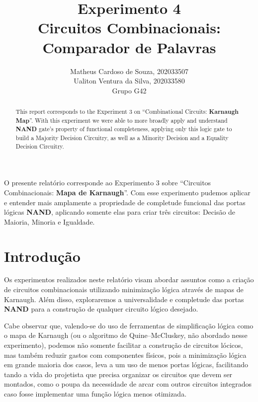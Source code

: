 \documentclass[12pt]{article}
\title{Experimento 4\\
Circuitos Combinacionais: Comparador de Palavras}
\author{Matheus Cardoso de Souza, 202033507\\
        Ualiton Ventura da Silva, 202033580\\
        Grupo G42
}
\begin{document}
\maketitle

 \begin{abstract}
   This report corresponds to the Experiment 3 on ``Combinational Circuits:
   \textbf{Karnaugh Map}''. With this experiment we were able to more broadly
   apply and understand \textbf{NAND} gate's property of functional
   completeness, applying only this logic gate to build a Majority Decision
   Circuitry, as well as a Minority Decision and a Equality Decision Circuitry.
 \end{abstract}

 \begin{resumo}
   O presente relatório corresponde ao Experimento 3 sobre ``Circuitos
   Combinacionais: \textbf{Mapa de Karnaugh}''. Com esse experimento pudemos
   aplicar e entender mais amplamente a propriedade de completude funcional das
   portas lógicas \textbf{NAND}, aplicando somente elas para criar três
   circuitos: Decisão de Maioria, Minoria e Igualdade.
 \end{resumo}


\section{Introdução}
\label{sec:Introducao}


Os experimentos realizados neste relatório visam abordar assuntos como a
criação de circuitos combinacionais utilizando minimização lógica através de
mapas de Karnaugh. Além disso, exploraremos a universalidade e completude das
portas \textbf{NAND} para a construção de qualquer circuito lógico desejado.

Cabe observar que, valendo-se do uso de ferramentas de simplificação lógica como
o mapa de Karnaugh (ou o algoritmo de Quine–McCluskey, não abordado nesse
experimento), podemos não somente facilitar a construção de circuitos lócicos,
mas também reduzir gastos com componentes físicos, pois a minimização lógica em
grande maioria dos casos, leva a um uso de menos portas lógicas, facilitando
tando a vida do projetista que precisa organizar os circuitos que devem ser
montados, como o poupa da necessidade de arcar com outros circuitos integrados
caso fosse implementar uma função lógica menos otimizada.
\end{document}
